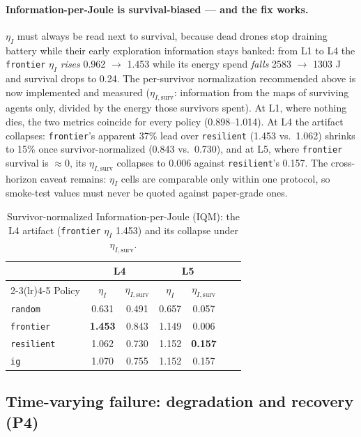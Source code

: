 \documentclass[12pt,a4paper]{article}
\begin{document}
\paragraph{Information-per-Joule is survival-biased --- and the fix works.}
$\eta_I$ must always be read next to survival, because dead drones stop
draining battery while their early exploration information stays banked: from
L1 to L4 the \texttt{frontier} $\eta_I$ \emph{rises} 0.962 $\to$ 1.453 while
its energy spend \emph{falls} 2583 $\to$ 1303 J and survival drops to 0.24.
The per-survivor normalization recommended above is now implemented and
measured ($\eta_{I,\mathrm{surv}}$: information from the maps of surviving
agents only, divided by the energy those survivors spent). At L1, where
nothing dies, the two metrics coincide for every policy (0.898--1.014). At
L4 the artifact collapses: \texttt{frontier}'s apparent 37\% lead over
\texttt{resilient} (1.453 vs.~1.062) shrinks to 15\% once survivor-normalized
(0.843 vs.~0.730), and at L5, where \texttt{frontier} survival is
$\approx 0$, its $\eta_{I,\mathrm{surv}}$ collapses to 0.006 against
\texttt{resilient}'s 0.157. The cross-horizon caveat remains: $\eta_I$ cells
are comparable only within one protocol, so smoke-test values must never be
quoted against paper-grade ones.

\begin{table}[h]
\centering
\caption{Survivor-normalized Information-per-Joule (IQM): the L4 artifact
(\texttt{frontier} $\eta_I$ 1.453) and its collapse under
$\eta_{I,\mathrm{surv}}$.}
\label{tab:etai}
\small
\begin{tabular}{lcccccc}
\toprule
 & \multicolumn{2}{c}{L4} & \multicolumn{2}{c}{L5} \\
\cmidrule(lr){2-3}\cmidrule(lr){4-5}
Policy & $\eta_I$ & $\eta_{I,\mathrm{surv}}$ & $\eta_I$ & $\eta_{I,\mathrm{surv}}$ \\
\midrule
\texttt{random}    & 0.631 & 0.491 & 0.657 & 0.057 \\
\texttt{frontier}  & \textbf{1.453} & 0.843 & 1.149 & 0.006 \\
\texttt{resilient} & 1.062 & 0.730 & 1.152 & \textbf{0.157} \\
\texttt{ig}        & 1.070 & 0.755 & 1.152 & 0.157 \\
\bottomrule
\end{tabular}
\end{table}

\subsection{Time-varying failure: degradation and recovery (P4)}
\end{document}
